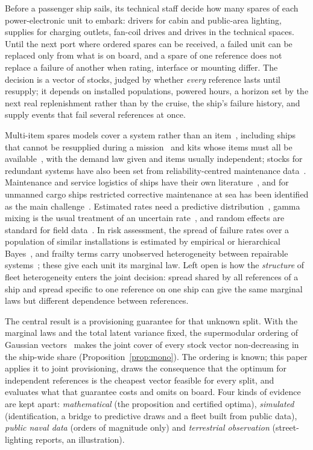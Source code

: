Before a passenger ship sails, its technical staff decide how
many spares of each power-electronic unit to embark: drivers for cabin and
public-area lighting, supplies for charging outlets, fan-coil drives and drives
in the technical spaces. Until the next port where ordered spares can be
received, a failed unit can be replaced only from what is on board, and a spare
of one reference does not replace a failure of another when rating, interface
or mounting differ. The decision is a vector of stocks, judged by whether
\emph{every} reference lasts until resupply; it depends on installed
populations, powered hours, a horizon set by the next real replenishment
rather than by the cruise, the ship's failure history, and supply events that
fail several references at once.

Multi-item spares models cover a system rather than an
item~\cite{sherbrooke2004,basten2014}, including ships that cannot be
resupplied during a mission~\cite{eruguz2018} and kits whose items must all be
available~\cite{mamer1982}, with the demand law given and items usually
independent; stocks for redundant systems have also been set from
reliability-centred maintenance data~\cite{vanjaarsveld2011}. Maintenance and
service logistics of ships have their own literature~\cite{eruguz2017}, and
for unmanned cargo ships restricted corrective maintenance at sea has been
identified as the main challenge~\cite{eriksen2021}. Estimated rates need a
predictive distribution~\cite{prak2017}, gamma mixing is the usual treatment
of an uncertain rate~\cite{aronis2004}, and random effects are standard for
field data~\cite{meeker2022}. In risk assessment, the spread of failure rates
over a population of similar installations is estimated by empirical or
hierarchical Bayes~\cite{vesely1994,kelly2009,hamada2008}, and frailty terms
carry unobserved heterogeneity between repairable
systems~\cite{lindqvist2006}; these give each unit its marginal law. Left
open is how the \emph{structure} of fleet
heterogeneity enters the joint decision: spread shared by all references of a
ship and spread specific to one reference on one ship can give the same
marginal laws but different dependence between references.

The central result is a provisioning guarantee for that unknown split. With
the marginal laws and the total latent variance fixed, the supermodular
ordering of Gaussian vectors~\cite{muller2000} makes the joint cover of every
stock vector non-decreasing in the ship-wide share
(Proposition~\ref{prop:mono}). The ordering is known; this paper applies it
to joint provisioning, draws the consequence that the optimum for independent
references is the cheapest vector feasible for every split, and evaluates what
that guarantee costs and omits on board. Four kinds of evidence are kept
apart: \emph{mathematical} (the proposition and certified optima),
\emph{simulated} (identification, a bridge to predictive draws and a fleet
built from public data), \emph{public naval data} (orders of magnitude only)
and \emph{terrestrial observation} (street-lighting reports, an
illustration).

